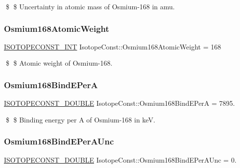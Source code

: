 \$ \$ Uncertainty in atomic mass of Osmium-\/168 in amu. \mbox{\label{group___isotope_const-_osmium-_os168_ga8b419173df9d7c7d0da3ee4995f0025c}} 
\subsubsection{\texorpdfstring{Osmium168\+Atomic\+Weight}{Osmium168AtomicWeight}}
{\footnotesize\ttfamily \mbox{\hyperlink{group___isotope_const-_macros_ga5f18360b3e99483a35c32d789e62621c}{I\+S\+O\+T\+O\+P\+E\+C\+O\+N\+S\+T\+\_\+\+I\+NT}} Isotope\+Const\+::\+Osmium168\+Atomic\+Weight = 168}

\$ \$ Atomic weight of Osmium-\/168. \mbox{\label{group___isotope_const-_osmium-_os168_ga675224030ebaccce5f0e52aef205e0b3}} 
\subsubsection{\texorpdfstring{Osmium168\+Bind\+E\+PerA}{Osmium168BindEPerA}}
{\footnotesize\ttfamily \mbox{\hyperlink{group___isotope_const-_macros_ga8f45a7272ce02c0b4c65c44636ed719a}{I\+S\+O\+T\+O\+P\+E\+C\+O\+N\+S\+T\+\_\+\+D\+O\+U\+B\+LE}} Isotope\+Const\+::\+Osmium168\+Bind\+E\+PerA = 7895.}

\$ \$ Binding energy per A of Osmium-\/168 in keV. \mbox{\label{group___isotope_const-_osmium-_os168_gab53ef184e365845ba4ed6d209fe85845}} 
\subsubsection{\texorpdfstring{Osmium168\+Bind\+E\+Per\+A\+Unc}{Osmium168BindEPerAUnc}}
{\footnotesize\ttfamily \mbox{\hyperlink{group___isotope_const-_macros_ga8f45a7272ce02c0b4c65c44636ed719a}{I\+S\+O\+T\+O\+P\+E\+C\+O\+N\+S\+T\+\_\+\+D\+O\+U\+B\+LE}} Isotope\+Const\+::\+Osmium168\+Bind\+E\+Per\+A\+Unc = 0.}

